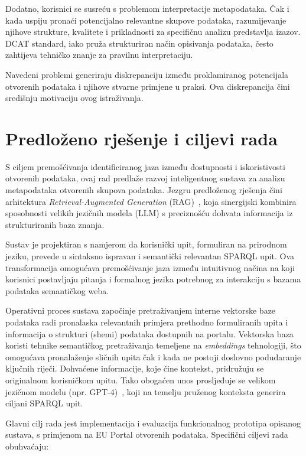 Dodatno, korisnici se susreću s problemom interpretacije metapodataka. Čak i kada uspiju pronaći potencijalno relevantne skupove podataka, razumijevanje njihove strukture, kvalitete i prikladnosti za specifičnu analizu predstavlja izazov. DCAT standard, iako pruža strukturiran način opisivanja podataka, često zahtijeva tehničko znanje za pravilnu interpretaciju.

Navedeni problemi generiraju diskrepanciju između proklamiranog potencijala otvorenih podataka i njihove stvarne primjene u praksi. Ova diskrepancija čini središnju motivaciju ovog istraživanja.

\section{Predloženo rješenje i ciljevi rada}

S ciljem premošćivanja identificiranog jaza između dostupnosti i iskoristivosti otvorenih podataka, ovaj rad predlaže razvoj inteligentnog sustava za analizu metapodataka otvorenih skupova podataka. Jezgru predloženog rješenja čini arhitektura \textit{Retrieval-Augmented Generation} (RAG)~\cite{lewis2020retrieval}, koja sinergijski kombinira sposobnosti velikih jezičnih modela (LLM) s preciznošću dohvata informacija iz strukturiranih baza znanja.

Sustav je projektiran s namjerom da korisnički upit, formuliran na prirodnom jeziku, prevede u sintaksno ispravan i semantički relevantan SPARQL upit. Ova transformacija omogućava premošćivanje jaza između intuitivnog načina na koji korisnici postavljaju pitanja i formalnog jezika potrebnog za interakciju s bazama podataka semantičkog weba.

Operativni proces sustava započinje pretraživanjem interne vektorske baze podataka radi pronalaska relevantnih primjera prethodno formuliranih upita i informacija o strukturi (shemi) podataka dostupnih na portalu. Vektorska baza koristi tehnike semantičkog pretraživanja temeljene na \textit{embeddings} tehnologiji, što omogućava pronalaženje sličnih upita čak i kada ne postoji doslovno podudaranje ključnih riječi. Dohvaćene informacije, koje čine kontekst, pridružuju se originalnom korisničkom upitu. Tako obogaćen unos prosljeđuje se velikom jezičnom modelu (npr. GPT-4)~\cite{brown2020language}, koji na temelju pruženog konteksta generira ciljani SPARQL upit.

Glavni cilj rada jest implementacija i evaluacija funkcionalnog prototipa opisanog sustava, s primjenom na EU Portal otvorenih podataka. Specifični ciljevi rada obuhvaćaju:

